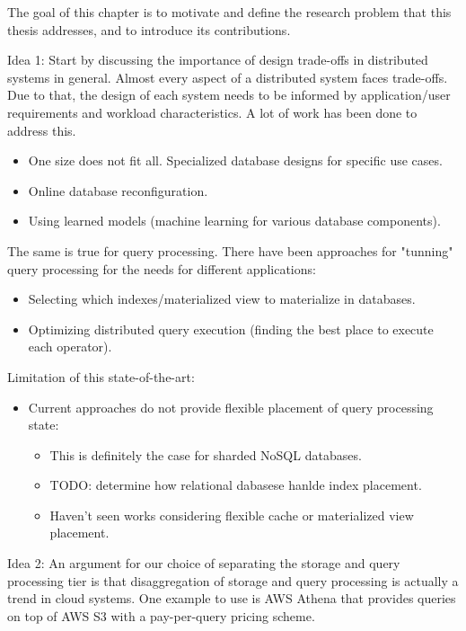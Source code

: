 The goal of this chapter is to motivate and define the research problem that
this thesis addresses, and to introduce its contributions.

Idea 1: Start by discussing the importance of design trade-offs in distributed
systems in general.
Almost every aspect of a distributed system faces trade-offs.
Due to that, the design of each system needs to be informed by application/user
requirements and workload characteristics.
A lot of work has been done to address this.
\begin{itemize}
  \item One size does not fit all. Specialized database designs for specific use
  cases.
  \item Online database reconfiguration.
  \item Using learned models (machine learning for various database components).
\end{itemize}

The same is true for query processing.
There have been approaches for "tunning" query processing for the needs for different applications:
\begin{itemize}
  \item Selecting which indexes/materialized view to materialize in databases.
  \item Optimizing distributed query execution (finding the best place to execute each operator).
\end{itemize}

Limitation of this state-of-the-art:
\begin{itemize}
  \item Current approaches do not provide flexible placement of query processing state:
  \begin{itemize}
    \item This is definitely the case for sharded NoSQL databases.
    \item TODO: determine how relational dabasese hanlde index placement.
    \item Haven't seen works considering flexible cache or materialized view placement.
  \end{itemize}
\end{itemize}

Idea 2: An argument for our choice of separating the storage and query processing tier is that disaggregation of storage
and query processing is actually a trend in cloud systems.
One example to use is AWS Athena that provides queries on top of AWS S3 with a pay-per-query pricing scheme.


